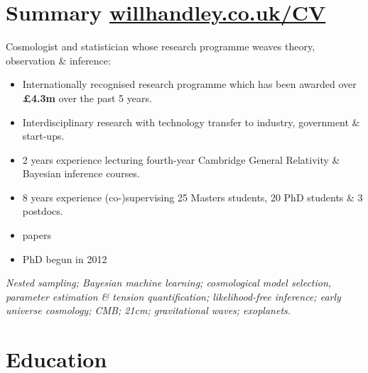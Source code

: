 \documentclass[11pt,a4paper,sans]{moderncv}
\begin{document}
\makecvtitle{}
\vspace{-10pt}
\section{Summary \hfill\href{www.willhandley.co.uk/CV}{willhandley.co.uk/CV}}
Cosmologist and statistician whose research programme weaves theory, observation \& inference:
\begin{itemize}
    \item Internationally recognised research programme which has been awarded over \textbf{\pounds4.3m} over the past 5 years.
    \item Interdisciplinary research with technology transfer to industry, government \& start-ups.
    \item 2 years experience lecturing fourth-year Cambridge General Relativity \& Bayesian inference courses. 
    \item 8 years experience (co-)supervising  25 Masters students, 20 PhD students \& 3 postdocs.
    \item {} papers
    \item PhD begun in 2012
\end{itemize}
\textit{
Nested sampling; Bayesian machine learning; cosmological model selection, parameter estimation \& tension quantification; likelihood-free inference; early universe cosmology; CMB; 21cm; gravitational waves; exoplanets.
}

\section{Education}
\end{document}
